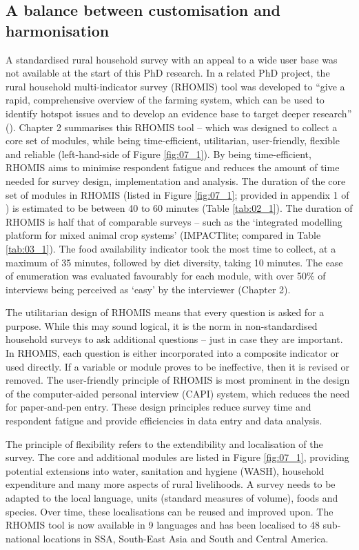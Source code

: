 \subsection{A balance between customisation and harmonisation}
A standardised rural household survey with an appeal to a wide user base was not available at the start of this PhD research. In a related PhD project, the rural household multi-indicator survey (RHOMIS) tool was developed to ``give a rapid, comprehensive overview of the farming system, which can be used to identify hotspot issues and to develop an evidence base to target deeper research'' (\citealp[P.~84]{Hammond2018}). Chapter 2 summarises this RHOMIS tool -- which was designed to collect a core set of modules, while being time-efficient, utilitarian, user-friendly, flexible and reliable (left-hand-side of Figure \ref{fig:07_1}). By being time-efficient, RHOMIS aims to minimise respondent fatigue and reduces the amount of time needed for survey design, implementation and analysis. The duration of the core set of modules in RHOMIS (listed in Figure \ref{fig:07_1}; provided in appendix 1 of \citealp{Hammond2018}) is estimated to be between 40 to 60 minutes (Table \ref{tab:02_1}). The duration of RHOMIS is half that of comparable surveys -- such as the `integrated modelling platform for mixed animal crop systems' (IMPACTlite; compared in Table \ref{tab:03_1}). The food availability indicator took the most time to collect, at a maximum of 35 minutes, followed by diet diversity, taking 10 minutes. The ease of enumeration was evaluated favourably for each module, with over 50\% of interviews being perceived as `easy' by the interviewer (Chapter 2).

The utilitarian design of RHOMIS means that every question is asked for a purpose. While this may sound logical, it is the norm in non-standardised household surveys to ask additional questions -- just in case they are important. In RHOMIS, each question is either incorporated into a composite indicator or used directly. If a variable or module proves to be ineffective, then it is revised or removed. The user-friendly principle of RHOMIS is most prominent in the design of the computer-aided personal interview (CAPI) system, which reduces the need for paper-and-pen entry. These design principles reduce survey time and respondent fatigue and provide efficiencies in data entry and data analysis.

The principle of flexibility refers to the extendibility and localisation of the survey. The core and additional modules are listed in Figure \ref{fig:07_1}, providing potential extensions into water, sanitation and hygiene (WASH), household expenditure and many more aspects of rural livelihoods. A survey needs to be adapted to the local language, units (standard measures of volume), foods and species. Over time, these localisations can be reused and improved upon. The RHOMIS tool is now available in 9 languages and has been localised to 48 sub-national locations in SSA, South-East Asia and South and Central America.

